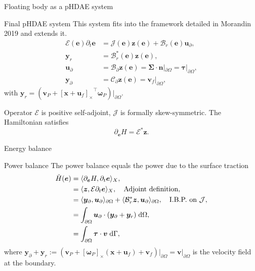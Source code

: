 \documentclass[aspectratio=169]{ISAE-Beamer}
\newcommand{\crmat}[1]{\ensuremath{\left[#1\right]_\times}}
\begin{document}
\begin{frame}{Floating body as a pHDAE system}
\begin{exampleblock}{Final pHDAE system}
	This system fits into the framework detailed in Morandin 2019  and extends it.
	\begin{equation*}
	\begin{aligned}
	\mathcal{E}(\bm{e}) \partial_t \bm{e} &= \mathcal{J}(\bm{e}) \bm{z}(\bm{e}) + {\mathcal{B}}_r(\bm{e}) \bm{u}_\partial, \\
	\bm{y}_r &= {\mathcal{B}}_r^*(\bm{e}) \bm{z}(\bm{e}), \\
	\bm{u}_\partial &= {\mathcal{B}}_{\partial} \bm{z}(\bm{e}) =  \bm\Sigma \cdot \bm{n}|_{\partial \Omega} = \bm\tau|_{\partial \Omega}, \\
	\bm{y}_\partial &= {\mathcal{C}}_{\partial} \bm{z}(\bm{e}) = \bm{v}_f|_{\partial \Omega},
	\end{aligned}
	\end{equation*}
	with $\bm{y}_r = (\bm{v}_P + \crmat{\bm{x}+\bm{u}_f}^\top \bm{\omega}_P)\vert_{\partial\Omega}$.
\end{exampleblock}
Operator ${\mathcal{E}}$ is positive self-adjoint, ${\mathcal{J}}$ is formally skew-symmetric.
The Hamiltonian  satisfies 
\begin{equation*}
\partial_{\bm{e}} H = {\mathcal{E}}^* \bm{z}.
\end{equation*}
\end{frame}

\begin{frame}{Energy balance}

\begin{exampleblock}{Power balance}
	The power balance equals the power due to the surface traction
	\begin{equation*}
	\setlength{\abovedisplayskip}{5pt}
	\setlength{\belowdisplayskip}{5pt}
	\begin{aligned}
	\dot{H}(\bm{e}) &= \langle \partial_{\bm{e}} H, \partial_t {\bm{e}} \rangle_{X},\\
	&= \langle \bm{z}, {\mathcal{E}} \partial_t {\bm{e}} \rangle_{{X}}, \quad \text{Adjoint definition},  \\
	&= \langle \bm{y}_\partial,  \bm{u}_\partial \rangle_{\partial\Omega} + \langle {\mathcal{B}}_r^* \bm{z}, \bm{u}_\partial \rangle_{\partial\Omega}, \quad \text{I.B.P. on } {\mathcal{J}}, \\
	&=  \int_{\partial \Omega} \bm{u}_\partial \cdot (\bm{y}_\partial + \bm{y}_r)  \d{\Omega}, \\
	&= \int_{\partial \Omega} \bm\tau \cdot \bm{v} \d\Gamma,  \\
	\end{aligned}
	\end{equation*}
	where $\bm{y}_\partial + \bm{y}_r := (\bm{v}_P + \crmat{\bm{\omega}_P} (\bm{x}+\bm{u}_f) + {\bm{v}}_f)\vert_{\partial\Omega} = \bm{v}\vert_{\partial\Omega}$ is the velocity field at the boundary.
\end{exampleblock}

\end{frame}
\end{document}
